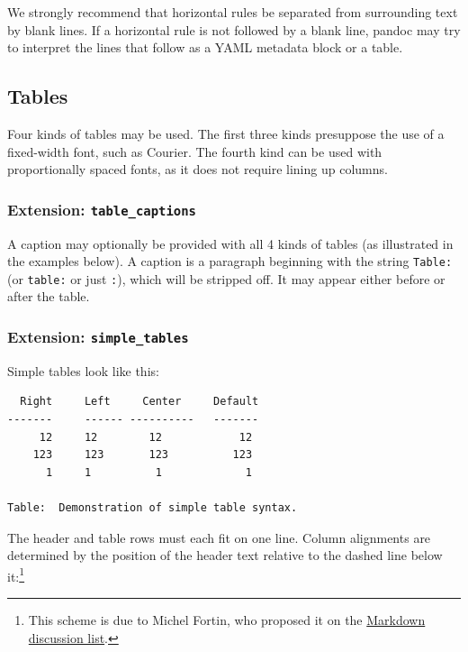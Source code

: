 \documentclass[
]{article}
\begin{document}
We strongly recommend that horizontal rules be separated from
surrounding text by blank lines. If a horizontal rule is not followed by
a blank line, pandoc may try to interpret the lines that follow as a
YAML metadata block or a table.

\hypertarget{tables}{%
\subsection{Tables}\label{tables}}

Four kinds of tables may be used. The first three kinds presuppose the
use of a fixed-width font, such as Courier. The fourth kind can be used
with proportionally spaced fonts, as it does not require lining up
columns.

\hypertarget{extension-table_captions}{%
\subsubsection{\texorpdfstring{Extension:
\texttt{table\_captions}}{Extension: table\_captions}}\label{extension-table_captions}}

A caption may optionally be provided with all 4 kinds of tables (as
illustrated in the examples below). A caption is a paragraph beginning
with the string \texttt{Table:} (or \texttt{table:} or just \texttt{:}),
which will be stripped off. It may appear either before or after the
table.

\hypertarget{extension-simple_tables}{%
\subsubsection{\texorpdfstring{Extension:
\texttt{simple\_tables}}{Extension: simple\_tables}}\label{extension-simple_tables}}

Simple tables look like this:

\begin{verbatim}
  Right     Left     Center     Default
-------     ------ ----------   -------
     12     12        12            12
    123     123       123          123
      1     1          1             1

Table:  Demonstration of simple table syntax.
\end{verbatim}

The header and table rows must each fit on one line. Column alignments
are determined by the position of the header text relative to the dashed
line below it:\footnote{This scheme is due to Michel Fortin, who
  proposed it on the
  \href{http://six.pairlist.net/pipermail/markdown-discuss/2005-March/001097.html}{Markdown
  discussion list}.}
\end{document}
